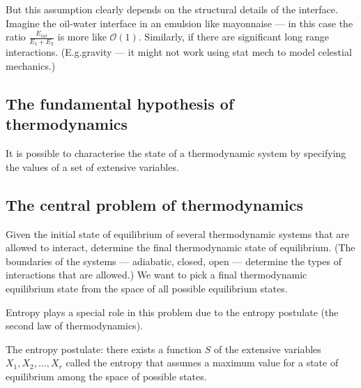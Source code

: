 \documentclass{article}
\begin{document}
But this assumption clearly depends on the structural details of the interface. Imagine the oil-water interface in an emulsion like mayonnaise --- in this case the ratio  $\frac{E_{int}}{E_1+E_2}$ is more like $\mathcal{O}(1)$.
Similarly, if there are significant long range interactions. (E.g.gravity --- it might not work using stat mech to model celestial mechanics.)

\subsection*{The fundamental hypothesis of thermodynamics}
It is possible to characterise the state of a thermodynamic system by specifying the values of a set of extensive variables.

\subsection*{The central problem of thermodynamics}
Given the initial state of equilibrium of several thermodynamic systems that are allowed to interact, determine the final thermodynamic state of equilibrium. (The boundaries of the systems --- adiabatic, closed, open --- determine the types of interactions that are allowed.) We want to pick a final thermodynamic equilibrium state from the space of all possible equilibrium states.

Entropy plays a special role in this problem due to the entropy postulate (the second law of thermodynamics).

The entropy postulate: there exists a function $S$ of the extensive variables $X_1,X_2,\ldots,X_r$ called the entropy that assumes a maximum value for a state of equilibrium among the space of possible states.
\end{document}
